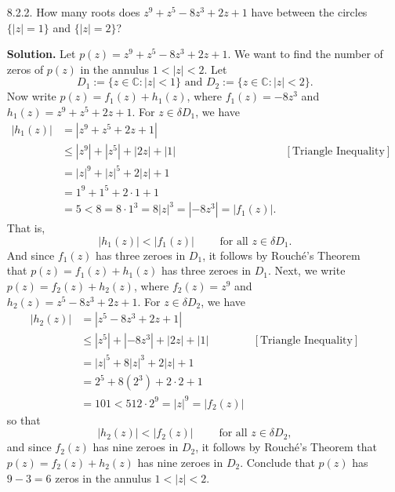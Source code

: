 \documentclass[9pt]{article}
\newcommand{\C}{\mathbb{C}}
\begin{document}
\begin{enumerate}
   \item[8.2.2.]  How many roots does $z^9 + z^5 - 8z^3 + 2z + 1$ have between
                  the circles $\{|z| = 1\}$ and $\{|z| = 2\}$?

      \textbf{Solution.} Let $p(z) = z^9 + z^5 - 8z^3 + 2z + 1$. We want to find
      the number of zeros of $p(z)$ in the annulus $1 < |z| < 2$. Let
      $$D_1 := \{z \in \C : |z| < 1\} \text{ and }
        D_2 := \{z \in \C : |z| < 2\}.$$
      Now write $p(z) = f_1(z) + h_1(z)$, where $f_1(z) = -8z^3$ and
      $h_1(z) = z^9 + z^5 + 2z + 1$. For $z \in \delta D_1$, we have
      \begin{align*}
         |h_1(z)| &= |z^9 + z^5 + 2z + 1| \\
            &\le |z^9| + |z^5| + |2z| + |1| &[\text{Triangle Inequality}] \\
            &= |z|^9 + |z|^5 + 2|z| + 1 \\
            &= 1^9 + 1^5 + 2 \cdot 1 + 1 \\
            &= 5 < 8 = 8 \cdot 1^3 = 8|z|^3 = |-8z^3| = |f_1(z)|.      
      \end{align*}
      That is,
      $$|h_1(z)| < |f_1(z)| \qquad \text{ for all } z \in \delta D_1.$$
      And since $f_1(z)$ has three zeroes in $D_1$, it follows by Rouch\'{e}'s
      Theorem that $p(z) = f_1(z) + h_1(z)$ has three zeroes in $D_1$. Next, we
      write $p(z) = f_2(z) + h_2(z)$, where $f_2(z) = z^9$ and
      $h_2(z) = z^5 - 8z^3 + 2z + 1$. For $z \in \delta D_2$, we have
      \begin{align*}
         |h_2(z)| &= |z^5 - 8z^3 + 2z + 1| \\
            &\le |z^5| + |-8z^3| + |2z| + |1| &[\text{Triangle Inequality}] \\
            &= |z|^5 + 8|z|^3 + 2|z| + 1 \\
            &= 2^5 + 8(2^3) + 2 \cdot 2 + 1 \\
            &= 101 < 512 \cdot 2^9 = |z|^9 = |f_2(z)|
      \end{align*}
      so that
      $$|h_2(z)| < |f_2(z)| \qquad \text{ for all } z \in \delta D_2,$$
      and since $f_2(z)$ has nine zeroes in $D_2$, it follows by Rouch\'{e}'s
      Theorem that $p(z) = f_2(z) + h_2(z)$ has nine zeroes in $D_2$. Conclude
      that $p(z)$ has $9 - 3 = 6$ zeros in the annulus $1 < |z| < 2$.

\end{enumerate}
\end{document}
